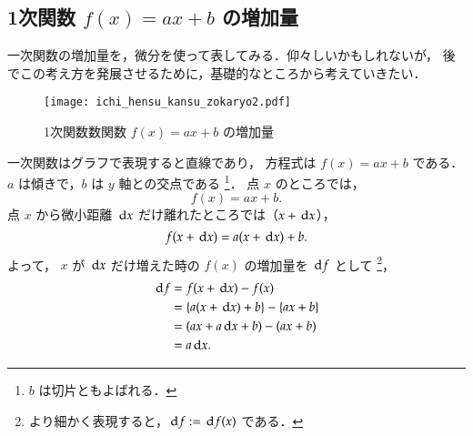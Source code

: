             \subsection{1次関数 $f(x)=ax+b$ の増加量}
                一次関数の増加量を，微分を使って表してみる．仰々しいかもしれないが，
                後でこの考え方を発展させるために，基礎的なところから考えていきたい．
                \begin{figure}[hbt]
                    \begin{center}
                        \texttt{[image: ichi\_hensu\_kansu\_zokaryo2.pdf]}
                        \caption{1次関数数関数 $f(x)=ax+b$ の増加量}
                        \label{fig:ichi_hensu_kansu_zokaryo2}
                    \end{center}
                \end{figure}

                一次関数はグラフで表現すると直線であり，
                方程式は $f(x)=ax+b$ である．$a$ は傾きで，$b$ は $y$ 軸との交点である
                        \footnote{
                                $b$ は切片ともよばれる．
                        }．
                                点 $x$ のところでは，
                                        \begin{equation*}
                                                f(x) = ax + b.
                                        \end{equation*}
                                点 $x$ から微小距離 $\,\mathrm{d} x$ だけ離れたところでは（$x+\,\mathrm{d} x$），
                                        \begin{equation*}
                                                f(x+\,\mathrm{d} x)=a(x+\,\mathrm{d} x)+b.
                                        \end{equation*}
                                よって， $x$ が $\,\mathrm{d} x$ だけ増えた時の $f(x)$ の増加量を $\,\mathrm{d} f$ として
                                        \footnote{
                                                より細かく表現すると，$\,\mathrm{d} f := \,\mathrm{d} f(x)$ である．
                                        }，
                                        \begin{align*}
                                                \,\mathrm{d} f &= f(x+\,\mathrm{d} x) - f(x) \\
                                                      &= \{a(x+\,\mathrm{d} x)+b\} - \{ax + b\} \\
                                                      &= (ax + a\,\mathrm{d} x + b) - (ax + b) \\
                                                      &= a \,\mathrm{d} x.
                                        \end{align*}

